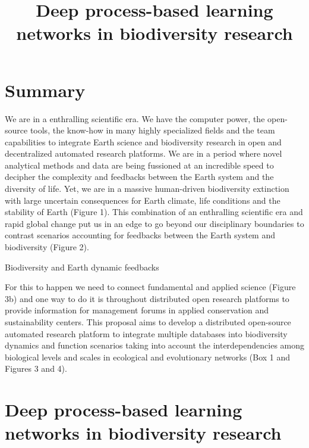 \documentclass[twocolumn]{article}
\title{{Deep process-based learning networks in biodiversity research}}
\author[]{}
\date{} %
\begin{document}
\maketitle


\section*{Summary}
We are in a enthralling scientific era. We have the computer power,
the open-source tools, the know-how in many highly specialized fields
and the team capabilities to integrate Earth science and biodiversity
research in open and decentralized automated research platforms. We
are in a period where novel analytical methods and data are being
fussioned at an incredible speed to decipher the complexity and
feedbacks between the Earth system and the diversity of life. Yet, we
are in a massive human-driven biodiversity extinction with large
uncertain consequences for Earth climate, life conditions and the
stability of Earth (Figure 1). This combination of an enthralling
scientific era and rapid global change put us in an edge to go beyond
our disciplinary boundaries to contrast scenarios accounting for
feedbacks between the Earth system and biodiversity (Figure 2).




Biodiversity and Earth dynamic feedbacks 





For
this to happen we need to connect fundamental and applied science
(Figure 3b) and one way to do it is throughout distributed open
research platforms to provide information for management forums in
applied conservation and sustainability centers. This proposal aims to
develop a distributed open-source automated research platform to
integrate multiple databases into biodiversity dynamics and function
scenarios taking into account the interdependencies among biological
levels and scales in ecological and evolutionary networks (Box 1 and
Figures 3 and 4).

\newpage
\setcounter{page}{0}
\clearpage
\pagebreak
\section*{Deep process-based learning networks in biodiversity research}
\end{document}
